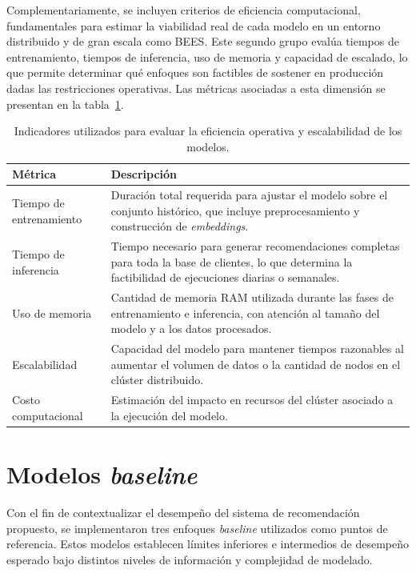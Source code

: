 Complementariamente, se incluyen criterios de eficiencia computacional, fundamentales para estimar la viabilidad real de cada modelo en un entorno distribuido y de gran escala como BEES.
Este segundo grupo evalúa tiempos de entrenamiento, tiempos de inferencia, uso de memoria y capacidad de escalado, lo que permite determinar qué enfoques son factibles de sostener en producción dadas las restricciones operativas.
Las métricas asociadas a esta dimensión se presentan en la tabla~\ref{tab:eval_efficiency}.

\begin{table}[H]
    \centering
    \caption[Métricas de eficiencia computacional]{Indicadores utilizados para evaluar la eficiencia operativa y escalabilidad de los modelos.}
    \begin{tabular}{l p{}}
        \toprule
        \textbf{Métrica} & \textbf{Descripción} \\
        \midrule
        Tiempo de entrenamiento & Duración total requerida para ajustar el modelo sobre el conjunto histórico, que incluye preprocesamiento y construcción de \textit{embeddings}. \\
        Tiempo de inferencia & Tiempo necesario para generar recomendaciones completas para toda la base de clientes, lo que determina la factibilidad de ejecuciones diarias o semanales. \\
        Uso de memoria & Cantidad de memoria RAM utilizada durante las fases de entrenamiento e inferencia, con atención al tamaño del modelo y a los datos procesados. \\
        Escalabilidad & Capacidad del modelo para mantener tiempos razonables al aumentar el volumen de datos o la cantidad de nodos en el clúster distribuido. \\
        Costo computacional & Estimación del impacto en recursos del clúster asociado a la ejecución del modelo. \\
        \bottomrule
    \end{tabular}
    \label{tab:eval_efficiency}
\end{table}


\section{Modelos \textit{baseline}}

Con el fin de contextualizar el desempeño del sistema de recomendación propuesto, se implementaron tres enfoques \textit{baseline} utilizados como puntos de referencia. Estos modelos establecen límites inferiores e intermedios de desempeño esperado bajo distintos niveles de información y complejidad de modelado.

